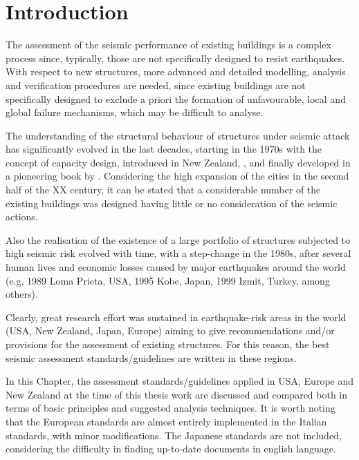 \section{Introduction}



The assessment of the seismic performance of existing buildings is a complex process since, typically, those are not specifically designed to resist earthquakes. With respect to new structures, more advanced and detailed modelling, analysis and verification procedures are needed, since existing buildings are not specifically designed to exclude a priori the formation of unfavourable, local and global failure mechanisms, which may be difficult to analyse.

The understanding of the structural behaviour of structures under seismic attack has significantly evolved in the last decades, starting in the 1970s with the concept of capacity design, introduced in New Zealand, \cite{hollings1969}, and finally developed in a pioneering book by \cite{park1975}. Considering the high expansion of the cities in the second half of the XX century, it can be stated that a considerable number of the existing buildings was designed having little or no consideration of the seismic actions.

Also the realisation of the existence of a large portfolio of structures subjected to high seismic risk evolved with time, with a step-change in the 1980s, after several human lives and economic losses caused by major earthquakes around the world (e.g. 1989 Loma Prieta, USA, 1995 Kobe, Japan, 1999 Izmit, Turkey, among others).

Clearly, great research effort was sustained in earthquake-risk areas in the world (USA, New Zealand, Japan, Europe) aiming to give recommendations and/or provisions for the assessment of existing structures. For this reason, the best seismic assessment standards/guidelines are written in these regions.

In this Chapter, the assessment standards/guidelines applied in USA, Europe and New Zealand at the time of this thesis work are discussed and compared both in terms of basic principles and suggested analysis techniques. It is worth noting that the European standards are almost entirely implemented in the Italian standards, with minor modifications. The Japanese standards are not included, considering the difficulty in finding up-to-date documents in english language.

